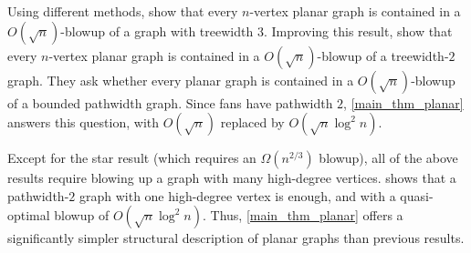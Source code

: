 \documentclass{patmorin}
\DeclareMathOperator{\tw}{tw}
\begin{document}



Using different methods, \citet{ISW} show that every $n$-vertex planar graph is contained in a $O(\sqrt{n})$-blowup of a graph with treewidth 3. 
Improving this result, \citet{distel.dujmovic.ea:product} show that every $n$-vertex planar graph is contained in a $O(\sqrt{n})$-blowup of a  treewidth-$2$ graph. They  ask whether every planar graph is contained in a $O(\sqrt{n})$-blowup of a bounded pathwidth graph.
Since fans have pathwidth $2$, \cref{main_thm_planar} answers this question, with $O(\sqrt{n})$ replaced by $O(\sqrt{n}\log^2 n)$.  

Except for the star result (which requires an $\Omega(n^{2/3})$ blowup), all of the above results require blowing up a graph with many high-degree vertices.   shows that a pathwidth-$2$ graph with one high-degree vertex is enough, and with a quasi-optimal blowup of $O(\sqrt{n}\log^2 n)$.  Thus, \cref{main_thm_planar} offers a significantly simpler structural description of planar graphs than previous results. 

\end{document}
